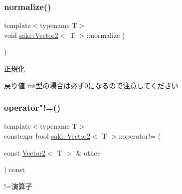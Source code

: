 \mbox{\label{classsaki_1_1_vector2_a8267f8608ffad9796813856c05076d8c}} 
\subsubsection{\texorpdfstring{normalize()}{normalize()}}
{\footnotesize\ttfamily template$<$typename T$>$ \\
void \mbox{\hyperlink{classsaki_1_1_vector2}{saki\+::\+Vector2}}$<$ T $>$\+::normalize (\begin{DoxyParamCaption}{ }\end{DoxyParamCaption})\hspace{0.3cm}{\ttfamily [inline]}}



正規化 

\begin{DoxyReturn}{戻り値}
int型の場合は必ず0になるので注意してください 
\end{DoxyReturn}
\mbox{\label{classsaki_1_1_vector2_a060dff3676c9f427fba232c301e011b7}} 
\subsubsection{\texorpdfstring{operator"!=()}{operator!=()}}
{\footnotesize\ttfamily template$<$typename T$>$ \\
constexpr bool \mbox{\hyperlink{classsaki_1_1_vector2}{saki\+::\+Vector2}}$<$ T $>$\+::operator!= (\begin{DoxyParamCaption}\item[{const \mbox{\hyperlink{classsaki_1_1_vector2}{Vector2}}$<$ T $>$ \&}]{other }\end{DoxyParamCaption}) const\hspace{0.3cm}{\ttfamily [inline]}}



!=演算子 

\mbox{\label{classsaki_1_1_vector2_aaaac42e1c348c453fad5ac0f2b7029d7}} 
